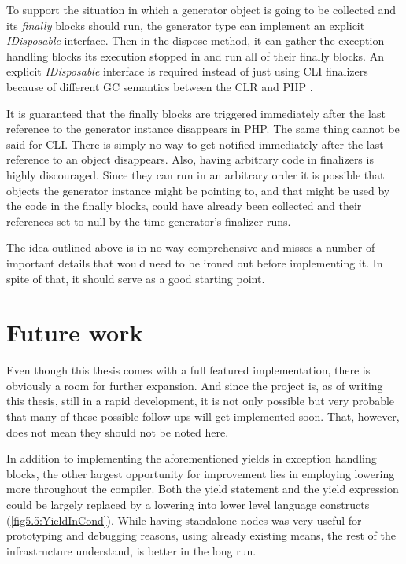 To support the situation in which a generator object is going to be collected and its \emph{finally} blocks should run, the generator type can implement an explicit \emph{IDisposable} interface. Then in the dispose method, it can gather the exception handling blocks its execution stopped in and run all of their finally blocks. An explicit \emph{IDisposable} interface is required instead of just using CLI finalizers because of different GC semantics between the CLR and PHP \citep{GenPHPRFC, CSharpEcma}. 

It is guaranteed that the finally blocks are triggered immediately after the last reference to the generator instance disappears in PHP. The same thing cannot be said for CLI. There is simply no way to get notified immediately after the last reference to an object disappears. Also, having arbitrary code in finalizers is highly discouraged. Since they can run in an arbitrary order it is possible that objects the generator instance might be pointing to, and that might be used by the code in the finally blocks, could have already been collected and their references set to null by the time generator’s finalizer runs. 

The idea outlined above is in no way comprehensive and misses a number of important details that would need to be ironed out before implementing it. In spite of that, it should serve as a good starting point.

\section{Future work}

Even though this thesis comes with a full featured implementation, there is obviously a room for further expansion. And since the project is, as of writing this thesis, still in a rapid development, it is not only possible but very probable that many of these possible follow ups will get implemented soon. That, however, does not mean they should not be noted here.

In addition to implementing the aforementioned yields in exception handling blocks, the other largest opportunity for improvement lies in employing lowering more throughout the compiler. Both the yield statement and the yield expression could be largely replaced by a lowering into lower level language constructs (\autoref{fig5.5:YieldInCond}). While having standalone nodes was very useful for prototyping and debugging reasons, using already existing means, the rest of the infrastructure understand, is better in the long run. 

